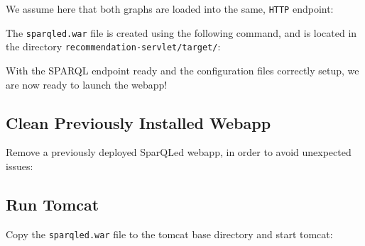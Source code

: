 We assume here that both graphs are loaded into the same, \texttt{HTTP} endpoint:

\bigskip
\begin{raggedleft}
\end{raggedleft}
\hfill

The \texttt{sparqled.war} file is created using the following command, and is located in the directory \texttt{recommendation-servlet/target/}:

\bigskip
\begin{raggedleft}
\end{raggedleft}

\label{sec:sparqled}

With the SPARQL endpoint ready and the configuration files correctly setup, we are now ready to launch the webapp!

\subsection{Clean Previously Installed Webapp}

Remove a previously deployed SparQLed webapp, in order to avoid unexpected issues:

\bigskip
\begin{raggedleft}
\marginnote[-0.2cm]{\textcolor{blue}{On Ubuntu, \$CATALINA\_BASE=/var/lib/tomcat6/}}
\end{raggedleft}

\subsection{Run Tomcat}

Copy the \texttt{sparqled.war} file to the tomcat base directory and start tomcat:

\bigskip
\begin{raggedleft}
\end{raggedleft}

